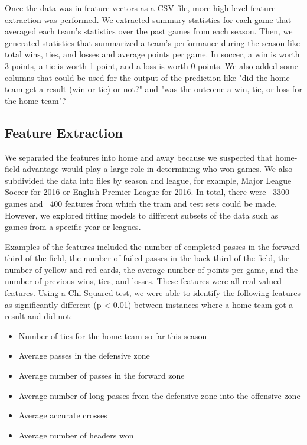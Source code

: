 Once the data was in feature vectors as a CSV file, more high-level feature extraction was performed. We extracted summary statistics for each game that averaged each team's statistics over the past games from each season. Then, we generated statistics that summarized a team's performance during the season like total wins, ties, and losses and average points per game. In soccer, a win is worth 3 points, a tie is worth 1 point, and a loss is worth 0 points. We also added some columns that could be used for the output of the prediction like "did the home team get a result (win or tie) or not?" and "was the outcome a win, tie, or loss for the home team"? 

\subsection{Feature Extraction}
We separated the features into home and away because we suspected that home-field advantage would play a large role in determining who won games. We also subdivided the data into files by season and league, for example, Major League Soccer for 2016 or English Premier League for 2016. In total, there were ~3300 games and ~400 features from which the train and test sets could be made. However, we explored fitting models to different subsets of the data such as games from a specific year or leagues.

Examples of the features included the number of completed passes in the forward third of the field, the number of failed passes in the back third of the field, the number of yellow and red cards, the average number of points per game, and the number of previous wins, ties, and losses. These features were all real-valued features. Using a Chi-Squared test, we were able to identify the following features as significantly different (p < 0.01) between instances where a home team got a result and did not:

\begin{itemize}
\item Number of ties for the home team so far this season
\item Average passes in the defensive zone
\item Average number of passes in the forward zone
\item Average number of long passes from the defensive zone into the offensive zone 
\item Average accurate crosses
\item Average number of headers won
\end{itemize}

